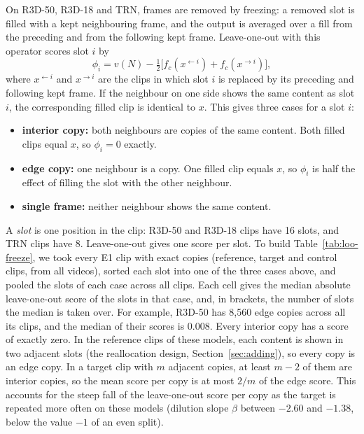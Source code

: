
On R3D-50, R3D-18 and TRN, frames are removed by freezing: a removed slot is filled with a kept neighbouring frame, and the output is averaged over a fill from the preceding and from the following kept frame.
Leave-one-out with this operator scores slot $i$ by
\begin{equation}
  \phi_i = v(N) - \tfrac{1}{2}\bigl[ f_c(x^{\leftarrow i}) + f_c(x^{\rightarrow i}) \bigr],
\end{equation}
where $x^{\leftarrow i}$ and $x^{\rightarrow i}$ are the clips in which slot $i$ is replaced by its preceding and following kept frame.
If the neighbour on one side shows the same content as slot $i$, the corresponding filled clip is identical to $x$.
This gives three cases for a slot $i$:
\begin{itemize}
  \item \textbf{interior copy:} both neighbours are copies of the same content. Both filled clips equal $x$, so $\phi_i = 0$ exactly.
  \item \textbf{edge copy:} one neighbour is a copy. One filled clip equals $x$, so $\phi_i$ is half the effect of filling the slot with the other neighbour.
  \item \textbf{single frame:} neither neighbour shows the same content.
\end{itemize}
A \emph{slot} is one position in the clip: R3D-50 and R3D-18 clips have 16 slots, and TRN clips have 8.
Leave-one-out gives one score per slot.
To build Table~\ref{tab:loo-freeze}, we took every E1 clip with exact copies (reference, target and control clips, from all videos), sorted each slot into one of the three cases above, and pooled the slots of each case across all clips.
Each cell gives the median absolute leave-one-out score of the slots in that case, and, in brackets, the number of slots the median is taken over.
For example, R3D-50 has 8{,}560 edge copies across all its clips, and the median of their scores is 0.008.
Every interior copy has a score of exactly zero.
In the reference clips of these models, each content is shown in two adjacent slots (the reallocation design, Section~\ref{sec:adding}), so every copy is an edge copy.
In a target clip with $m$ adjacent copies, at least $m - 2$ of them are interior copies, so the mean score per copy is at most $2/m$ of the edge score.
This accounts for the steep fall of the leave-one-out score per copy as the target is repeated more often on these models (dilution slope $\beta$ between $-2.60$ and $-1.38$, below the value $-1$ of an even split).

